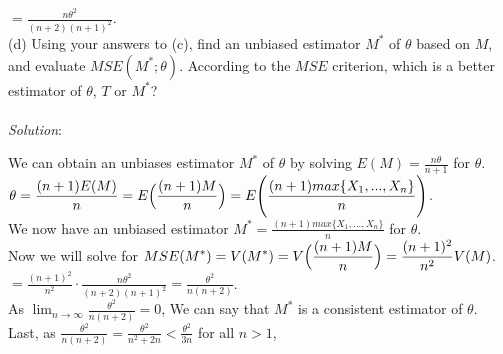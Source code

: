 \documentclass[12pt]{article}
\newcommand{\XB}{\color{black}}
\newcommand{\XV}{\color{violet}}
\begin{document}
$ \displaystyle = \frac{n\theta^{2}}{(n + 2)(n + 1)^{2}} $. \\



(d) Using your answers to (c), find an unbiased estimator $ M^{*} $ of $ \theta $ based on $ M $, and evaluate $ MSE(M^{*}; \theta) $. According to the $ MSE $ criterion, which is a better estimator of $ \theta $, $ T $ or $ M^{*} $?  \\
\vspace{2.5mm} \\
\textit{Solution}:
\vspace{2.5mm}

\noindent 
We can obtain an unbiases estimator $ M^{*} $ of $ \theta $ by solving $ \displaystyle E(M) = \frac{n\theta}{n + 1} $ for $ \theta $. \\

\noindent
$ \displaystyle \theta = \frac{(n + 1)E(M)}{n} = E\Bigl( \frac{(n + 1)M}{n} \Bigr) = E\Biggl( \frac{(n + 1)max\{X_{1},...,X_{n}\}}{n} \Biggr) $. \\

\noindent
We now have an unbiased estimator $ \displaystyle M^{*} = \frac{(n + 1)max\{X_{1},...,X_{n}\}}{n} $ for $ \theta $. \\

\noindent
Now we will solve for $ \displaystyle MSE(M^{*}) = V(M^{*}) = V\Bigl( \frac{(n + 1)M}{n} \Bigr) = \frac{(n + 1)^{2}}{n^{2}} V(M) $. \\

$ \displaystyle = \frac{(n + 1)^{2}}{n^{2}} \cdot \frac{n\theta^{2}}{(n + 2)(n + 1)^{2}} = \frac{\theta^{2}}{n(n + 2)} $. \\

\noindent
As $ \displaystyle \lim_{n \to \infty} \frac{\theta^{2}}{n(n + 2)} = 0 $, We can say that $ M^{*} $ is a consistent estimator of $ \theta $. \\

Last, as $ \displaystyle \frac{\theta^{2}}{n(n + 2)} = \frac{\theta^{2}}{n^{2} + 2n} < \frac{\theta^{2}}{3n} $ for all $ n > 1 $, \\
\end{document}
